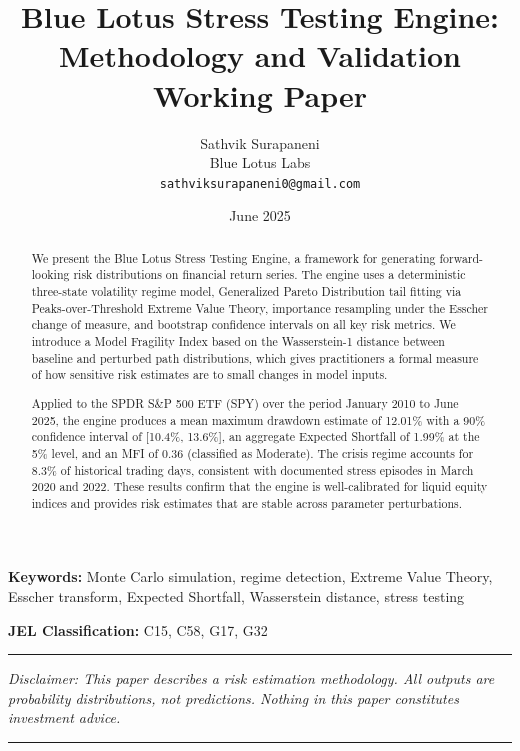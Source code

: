 \documentclass[12pt]{article}
\title{%
  \vspace{-1cm}
  \textbf{\Large Blue Lotus Stress Testing Engine:}\\[0.3em]
  \textbf{\Large Methodology and Validation}\\[1em]
  \normalsize Working Paper
}
\author{
  Sathvik Surapaneni\\[0.3em]
  \small Blue Lotus Labs\\[0.1em]
  \small \texttt{sathviksurapaneni0@gmail.com}
}
\date{June 2025}
\begin{document}
\maketitle
\thispagestyle{empty}

\begin{abstract}
\noindent
We present the Blue Lotus Stress Testing Engine, a framework for generating
forward-looking risk distributions on financial return series. The engine uses
a deterministic three-state volatility regime model, Generalized Pareto Distribution
tail fitting via Peaks-over-Threshold Extreme Value Theory, importance resampling
under the Esscher change of measure, and bootstrap confidence intervals on all key
risk metrics. We introduce a Model Fragility Index based on the Wasserstein-1
distance between baseline and perturbed path distributions, which gives practitioners
a formal measure of how sensitive risk estimates are to small changes in model inputs.

Applied to the SPDR S\&P 500 ETF (SPY) over the period January 2010 to June 2025, the
engine produces a mean maximum drawdown estimate of 12.01\% with a 90\% confidence
interval of [10.4\%, 13.6\%], an aggregate Expected Shortfall of 1.99\% at the 5\%
level, and an MFI of 0.36 (classified as Moderate). The crisis regime accounts for
8.3\% of historical trading days, consistent with documented stress episodes in
March 2020 and 2022. These results confirm that the engine is well-calibrated for
liquid equity indices and provides risk estimates that are stable across parameter
perturbations.
\end{abstract}

\vspace{0.5em}
\noindent\textbf{Keywords:} Monte Carlo simulation, regime detection, Extreme Value Theory,
Esscher transform, Expected Shortfall, Wasserstein distance, stress testing

\vspace{0.5em}
\noindent\textbf{JEL Classification:} C15, C58, G17, G32

\bigskip
\hrule
\vspace{0.3em}
{\small \textit{Disclaimer: This paper describes a risk estimation methodology. All outputs
are probability distributions, not predictions. Nothing in this paper constitutes
investment advice.}}
\hrule

\clearpage
\tableofcontents
\clearpage

\end{document}
